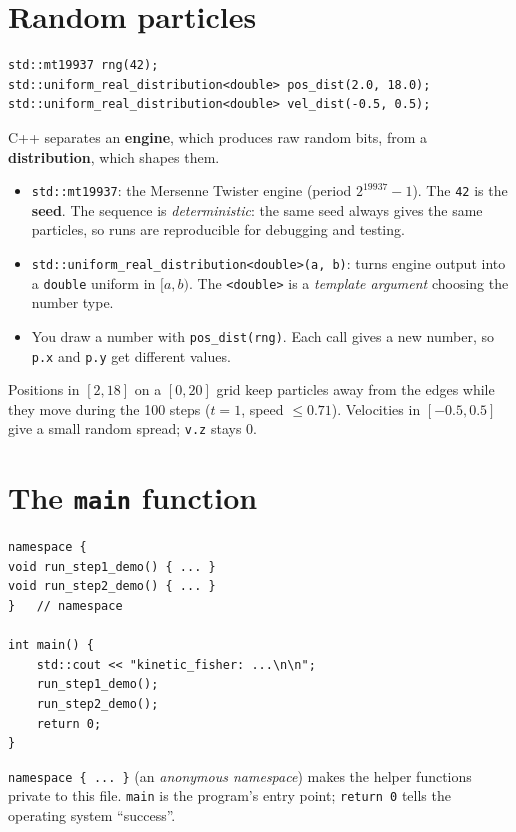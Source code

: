 \documentclass[11pt,a4paper]{article}
\begin{document}
\section{Random particles}

\begin{lstlisting}
std::mt19937 rng(42);
std::uniform_real_distribution<double> pos_dist(2.0, 18.0);
std::uniform_real_distribution<double> vel_dist(-0.5, 0.5);
\end{lstlisting}
C++ separates an \textbf{engine}, which produces raw random bits, from a \textbf{distribution}, which shapes them.
\begin{itemize}
  \item \texttt{std::mt19937}: the Mersenne Twister engine (period $2^{19937}-1$). The \texttt{42} is the
        \textbf{seed}. The sequence is \emph{deterministic}: the same seed always gives the same particles,
        so runs are reproducible for debugging and testing.
  \item \lstinline|std::uniform_real_distribution<double>(a, b)|: turns engine output into a \texttt{double}
        uniform in $[a,b)$. The \lstinline|<double>| is a \emph{template argument} choosing the number type.
  \item You draw a number with \lstinline|pos_dist(rng)|. Each call gives a new number, so \texttt{p.x} and
        \texttt{p.y} get different values.
\end{itemize}
Positions in $[2,18]$ on a $[0,20]$ grid keep particles away from the edges while they move during the
100 steps ($t=1$, speed $\le0.71$). Velocities in $[-0.5,0.5]$ give a small random spread; \texttt{v.z} stays $0$.

\section{The \texttt{main} function}

\begin{lstlisting}
namespace {
void run_step1_demo() { ... }
void run_step2_demo() { ... }
}   // namespace

int main() {
    std::cout << "kinetic_fisher: ...\n\n";
    run_step1_demo();
    run_step2_demo();
    return 0;
}
\end{lstlisting}
\lstinline|namespace { ... }| (an \emph{anonymous namespace}) makes the helper functions private to this file.
\texttt{main} is the program's entry point; \lstinline|return 0| tells the operating system ``success''.
\end{document}
